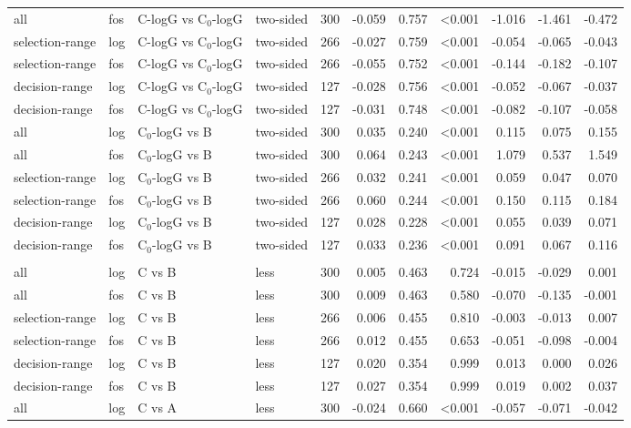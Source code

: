\begin{longtable}{llllrrrrrrr}
all & fos & C-logG vs C$_0$-logG & two-sided & 300 & -0.059 & 0.757 & <0.001 & -1.016 & -1.461 & -0.472 \\
selection-range & log & C-logG vs C$_0$-logG & two-sided & 266 & -0.027 & 0.759 & <0.001 & -0.054 & -0.065 & -0.043 \\
selection-range & fos & C-logG vs C$_0$-logG & two-sided & 266 & -0.055 & 0.752 & <0.001 & -0.144 & -0.182 & -0.107 \\
decision-range & log & C-logG vs C$_0$-logG & two-sided & 127 & -0.028 & 0.756 & <0.001 & -0.052 & -0.067 & -0.037 \\
decision-range & fos & C-logG vs C$_0$-logG & two-sided & 127 & -0.031 & 0.748 & <0.001 & -0.082 & -0.107 & -0.058 \\
all & log & C$_0$-logG vs B & two-sided & 300 & 0.035 & 0.240 & <0.001 & 0.115 & 0.075 & 0.155 \\
all & fos & C$_0$-logG vs B & two-sided & 300 & 0.064 & 0.243 & <0.001 & 1.079 & 0.537 & 1.549 \\
selection-range & log & C$_0$-logG vs B & two-sided & 266 & 0.032 & 0.241 & <0.001 & 0.059 & 0.047 & 0.070 \\
selection-range & fos & C$_0$-logG vs B & two-sided & 266 & 0.060 & 0.244 & <0.001 & 0.150 & 0.115 & 0.184 \\
decision-range & log & C$_0$-logG vs B & two-sided & 127 & 0.028 & 0.228 & <0.001 & 0.055 & 0.039 & 0.071 \\
decision-range & fos & C$_0$-logG vs B & two-sided & 127 & 0.033 & 0.236 & <0.001 & 0.091 & 0.067 & 0.116 \\
\addlinespace
\multicolumn{11}{l}{\textit{RF}} \\
all & log & C vs B & less & 300 & 0.005 & 0.463 & 0.724 & -0.015 & -0.029 & 0.001 \\
all & fos & C vs B & less & 300 & 0.009 & 0.463 & 0.580 & -0.070 & -0.135 & -0.001 \\
selection-range & log & C vs B & less & 266 & 0.006 & 0.455 & 0.810 & -0.003 & -0.013 & 0.007 \\
selection-range & fos & C vs B & less & 266 & 0.012 & 0.455 & 0.653 & -0.051 & -0.098 & -0.004 \\
decision-range & log & C vs B & less & 127 & 0.020 & 0.354 & 0.999 & 0.013 & 0.000 & 0.026 \\
decision-range & fos & C vs B & less & 127 & 0.027 & 0.354 & 0.999 & 0.019 & 0.002 & 0.037 \\
all & log & C vs A & less & 300 & -0.024 & 0.660 & <0.001 & -0.057 & -0.071 & -0.042 \\

\end{longtable}
